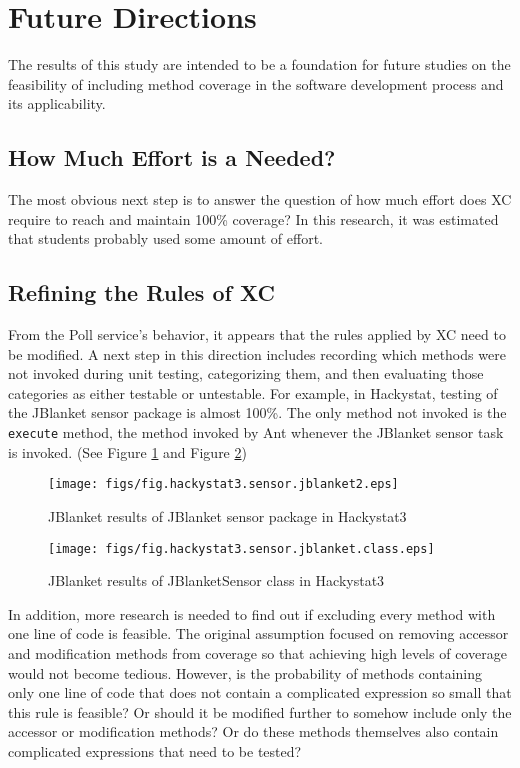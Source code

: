 \section{Future Directions}
The results of this study are intended to be a foundation for future
studies on the feasibility of including method coverage in the
software development process and its applicability.

\subsection{How Much Effort is a Needed?}
The most obvious next step is to answer the question of how much effort
does XC require to reach and maintain 100\% coverage?  In this research, it
was estimated that students probably used some amount of effort.

\subsection{Refining the Rules of XC}
From the Poll service's behavior, it appears that the rules applied by XC
need to be modified.  A next step in this direction includes recording
which methods were not invoked during unit testing, categorizing them, and
then evaluating those categories as either testable or untestable.  For
example, in Hackystat, testing of the JBlanket sensor package is almost
100\%.  The only method not invoked is the {\tt execute} method, the method
invoked by Ant whenever the JBlanket sensor task is invoked. (See Figure
\ref{fig:hackystat3.sensor.jblanket.package} and Figure
\ref{fig:hackystat3.sensor.jblanket.class})

\begin{figure}[htbp]
  \centering
  \texttt{[image: figs/fig.hackystat3.sensor.jblanket2.eps]}
  \caption{JBlanket results of JBlanket sensor package in Hackystat3}
  \label{fig:hackystat3.sensor.jblanket.package}
\end{figure}

\begin{figure}[htbp]
  \centering
  \texttt{[image: figs/fig.hackystat3.sensor.jblanket.class.eps]}
  \caption{JBlanket results of JBlanketSensor class in Hackystat3}
  \label{fig:hackystat3.sensor.jblanket.class}
\end{figure}

In addition, more research is needed to find out if excluding every method
with one line of code is feasible.  The original assumption focused on
removing accessor and modification methods from coverage so that achieving
high levels of coverage would not become tedious.  However, is the
probability of methods containing only one line of code that does not
contain a complicated expression so small that this rule is feasible?  Or
should it be modified further to somehow include only the accessor or
modification methods?  Or do these methods themselves also contain
complicated expressions that need to be tested?

